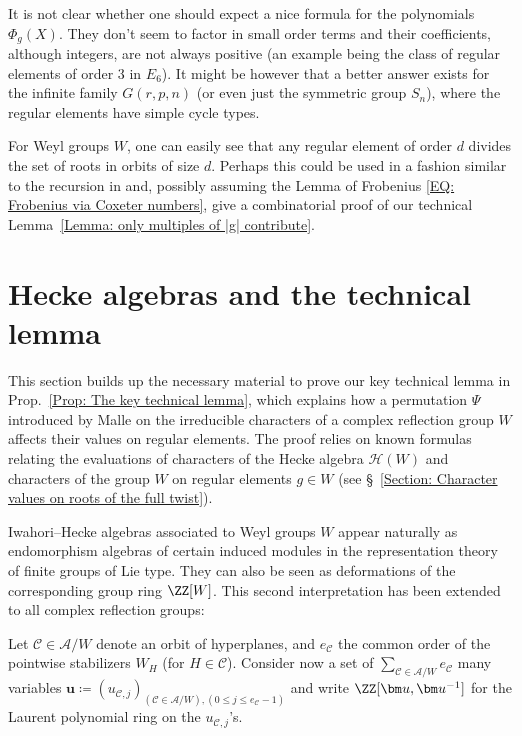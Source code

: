 \begin{rema}
It is not clear whether one should expect a nice formula for the polynomials $\Phi_g(X)$. They don't seem to factor in small order terms and their coefficients, although integers, are not always positive (an example being the class of regular elements of order $3$ in $E_6$). It might be however that a better answer exists for the infinite family $G(r,p,n)$ (or even just the symmetric group $S_n$), where the regular elements have simple cycle types.
\end{rema}

\begin{question}
For Weyl groups $W$, one can easily see \cite[Prop.~4.10]{springer-regular-elements} that any regular element of order $d$ divides the set of roots in orbits of size $d$.   Perhaps this could be used in a fashion similar to the recursion in \cite{deligne-letter-to-looijenga,reading-chains-in-noncrossing} and, possibly assuming the Lemma of Frobenius \eqref{EQ: Frobenius via Coxeter numbers}, give a combinatorial proof of our technical Lemma~\ref{Lemma: only multiples of |g| contribute}.
\end{question}


\section{Hecke algebras and the technical lemma}
\label{Section: Hecke algebras and the technical lemma}

This section builds up the necessary material to prove our key technical lemma in Prop.~\ref{Prop: The key technical lemma}, which explains how a permutation $\Psi$ introduced by Malle on the irreducible characters of a complex reflection group $W$ affects their values on regular elements. The proof relies on known formulas relating the evaluations of characters of the Hecke algebra $\mathcal{H}(W)$ and characters of the group $W$ on regular elements $g\in W$ (see \S~\ref{Section: Character values on roots of the full twist}). 

Iwahori--Hecke algebras associated to Weyl groups $W$ appear naturally as endomorphism algebras of certain induced modules in the representation theory of finite groups of Lie type. They can also be seen as deformations of the corresponding group ring $\ZZ[W]$. This second interpretation has been extended to all complex reflection groups:

Let $\mathcal{C}\in\mathcal{A}/W$ denote an orbit of hyperplanes, and $e_{\mathcal{C}}$ the common order of the pointwise stabilizers $W_H$ (for $H\in\mathcal{C}$). Consider now a set of $\sum_{\mathcal{C}\in\mathcal{A}/W}e_{\mathcal{C}}$ many variables $\bm u\coloneqq (u_{\mathcal{C},j})_{(\mathcal{C}\in\mathcal{A}/W),(0\leq j\leq e_{\mathcal{C}}-1)}$ and write $\ZZ[\bm u,\bm u^{-1}]$ for the Laurent polynomial ring on the $u_{\mathcal{C},j}$'s. 

